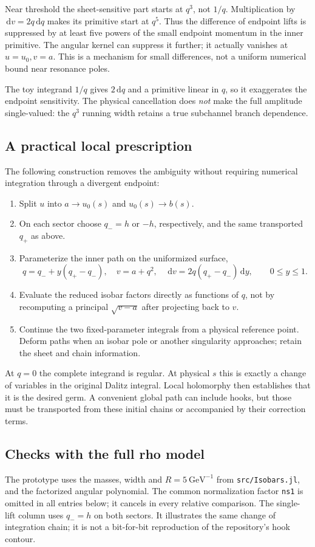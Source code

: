 \documentclass[11pt,a4paper]{article}
\newcommand{\dd}{\,\mathrm d}
\begin{document}
Near threshold the sheet-sensitive part starts at $q^3$, not $1/q$. Multiplication by $\dd v=2q\dd q$ makes its primitive start at $q^5$. Thus the difference of endpoint lifts is suppressed by at least five powers of the small endpoint momentum in the inner primitive. The angular kernel can suppress it further; it actually vanishes at $u=u_0,v=a$. This is a mechanism for small differences, not a uniform numerical bound near resonance poles.

The toy integrand $1/q$ gives $2\dd q$ and a primitive linear in $q$, so it exaggerates the endpoint sensitivity. The physical cancellation does \emph{not} make the full amplitude single-valued: the $q^3$ running width retains a true subchannel branch dependence.

\subsection{A practical local prescription}
The following construction removes the ambiguity without requiring numerical integration through a divergent endpoint:
\begin{enumerate}
\item Split $u$ into $a\to u_0(s)$ and $u_0(s)\to b(s)$.
\item On each sector choose $q_-=h$ or $-h$, respectively, and the same transported $q_+$ as above.
\item Parameterize the inner path on the uniformized surface,
\begin{equation}
 q=q_-+y(q_+-q_-),\quad v=a+q^2,\quad
 \dd v=2q(q_+-q_-)\dd y,\qquad 0\leq y\leq1.
\end{equation}
\item Evaluate the reduced isobar factors directly as functions of $q$, not by recomputing a principal $\sqrt{v-a}$ after projecting back to $v$.
\item Continue the two fixed-parameter integrals from a physical reference point. Deform paths when an isobar pole or another singularity approaches; retain the sheet and chain information.
\end{enumerate}
At $q=0$ the complete integrand is regular. At physical $s$ this is exactly a change of variables in the original Dalitz integral. Local holomorphy then establishes that it is the desired germ. A convenient global path can include hooks, but those must be transported from these initial chains or accompanied by their correction terms.

\subsection{Checks with the full rho model}
The prototype uses the masses, width and $R=5\ \mathrm{GeV}^{-1}$ from \texttt{src/Isobars.jl}, and the factorized angular polynomial. The common normalization factor \texttt{ns1} is omitted in all entries below; it cancels in every relative comparison. The single-lift column uses $q_-=h$ on both sectors. It illustrates the same change of integration chain; it is not a bit-for-bit reproduction of the repository's hook contour.
\end{document}
